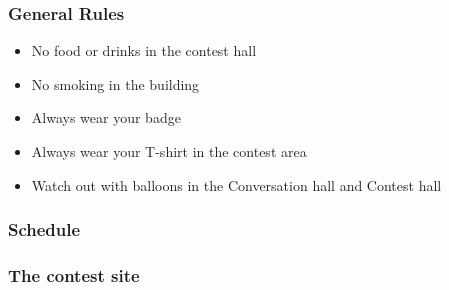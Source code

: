 \documentclass[t]{beamer}
\begin{document}
\begin{frame}
	\frametitle{General Rules}
	\begin{itemize}
		\item No food or drinks in the contest hall
		\item No smoking in the building
		\item Always wear your badge
		\item Always wear your T-shirt in the contest area
		\item Watch out with balloons in the Conversation hall and Contest hall
	\end{itemize}
\end{frame}
{}
\begin{frame}
	\frametitle{Schedule}
	\tableofcontents
\end{frame}
\begin{frame}[c]
	\frametitle{The contest site}
	\begin{pgfpicture}
	\end{pgfpicture}
\end{frame}
\end{document}
